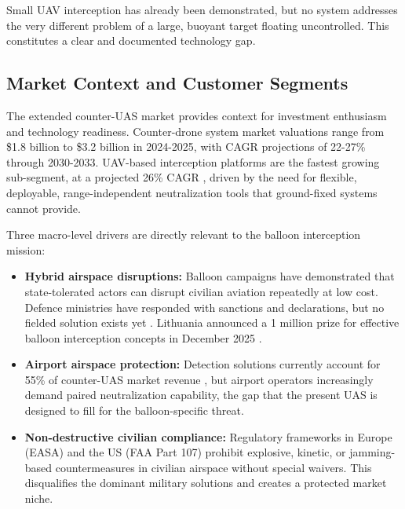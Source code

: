 Small UAV interception has already been demonstrated, but no system addresses the very different problem of a large, buoyant target floating uncontrolled. This constitutes a clear and documented technology gap.
 
 \vspace{-10pt}
\subsection*{Market Context and Customer Segments}
\label{subsec:market}
 
The extended counter-UAS market provides context for investment enthusiasm and technology readiness. Counter-drone system market valuations range from \$1.8 billion \cite{FutureDataStats2024Counter-Drone2024} to \$3.2 billion \cite{GrandViewResearch2025Anti-Drone20252033} in 2024-2025, with CAGR projections of 22-27\% through 2030-2033. UAV-based interception platforms are the fastest growing sub-segment, at a projected 26\% CAGR \cite{MordorIntelligence2025Anti-Drone20252030}, driven by the need for flexible, deployable, range-independent neutralization tools that ground-fixed systems cannot provide.
 
Three macro-level drivers are directly relevant to the balloon interception mission:
 
\begin{itemize}
  \item \textbf{Hybrid airspace disruptions:} Balloon campaigns have demonstrated that state-tolerated actors can disrupt civilian aviation repeatedly at low cost. Defence ministries have responded with sanctions and declarations, but no fielded solution exists yet \cite{CNN2025BalloonSays, AlJazeera2025LithuaniaBelarus}. Lithuania announced a \texteuro{}1 million prize for effective balloon interception concepts in December 2025 \cite{RFE/RLBelarusService2025UpBoth}.
 
  \item \textbf{Airport airspace protection:} Detection solutions currently account for 55\% of counter-UAS market revenue \cite{MordorIntelligence2025Anti-Drone20252030}, but airport operators increasingly demand paired neutralization capability, the gap that the present UAS is designed to fill for the balloon-specific threat.
 
  \item \textbf{Non-destructive civilian compliance:} Regulatory frameworks in Europe (EASA) and the US (FAA Part 107) prohibit explosive, kinetic, or jamming-based countermeasures in civilian airspace without special waivers. This disqualifies the dominant military solutions and creates a protected market niche.
\end{itemize}
 
